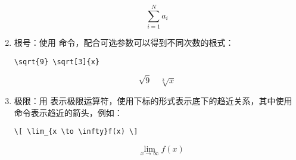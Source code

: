 \begin{enumerate}
\begin{tcolorbox}[sidebyside]
\tcblower

$$ \sum_{i=1}^{N} a_i $$
\end{tcolorbox}

\item 根号：使用 \boxforcmd{\\sqrt} 命令，配合可选参数可以得到不同次数的根式：

\begin{tcolorbox}[sidebyside]
\begin{lstlisting}
\sqrt{9} \sqrt[3]{x}
\end{lstlisting} 

\tcblower

$$ \sqrt{9} \quad \sqrt[3]{x} $$
\end{tcolorbox}

\item 极限：用 \boxforcmd{\\lim} 表示极限运算符，使用下标的形式表示底下的趋近关系，其中使用 \boxforcmd{\\to} 命令表示趋近的箭头，例如：

\begin{tcolorbox}[sidebyside]
\begin{lstlisting}
\[ \lim_{x \to \infty}f(x) \]
\end{lstlisting} 

\tcblower

\[ \quad \lim_{x \to \infty}f(x) \]
\end{tcolorbox}


\end{enumerate}

